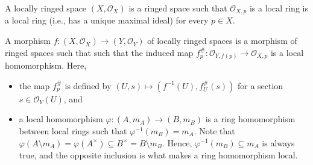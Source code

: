 A locally ringed space $(X, \mathcal{O}_X)$ is a ringed space such that
$\mathcal{O}_{X, p}$ is a local ring is a local ring (i.e., has a unique maximal
ideal) for every $p \in X$.

A morphism $f\colon (X, \mathcal{O}_X)\to (Y, \mathcal{O}_Y)$ of locally ringed spaces is a morphism of ringed spaces such that
such that the induced map $f_p^\#\colon \mathcal{O}_{Y, f(p)} \to \mathcal{O}_{X, p}$ is a local
homomorphism. Here,
\begin{itemize}
	\item the map $f_p^\#$ is defined by $(U, s)\mapsto (f^{-1}(U), f^\#_U(s))$ for
		a section $s \in \mathcal{O}_Y(U)$, and
	\item a local homomorphism $\varphi\colon (A, m_A)\to (B, m_B)$ is a ring homomorphism between local rings such that
		$\varphi^{-1}(m_B) = m_A$. Note that $\varphi(A\setminus m_A) = \varphi(A^\times) \subseteq B^\times = B\setminus m_B$.
		Hence, $\varphi^{-1}(m_B) \subseteq m_A$ is always true, and the opposite
		inclusion is what makes a ring homomorphism local.
\end{itemize}
